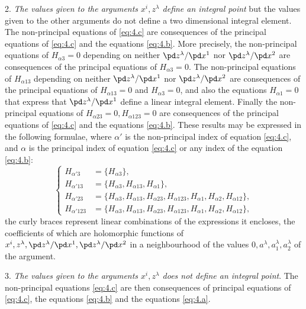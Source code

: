 2. \emph{The values given to the arguments $x^{i}, z^{\lambda}$ define an integral point} but the values given to the other arguments do not define a two dimensional integral element. The non-principal equations of \eqref{eq:4.c} are  consequences of the principal equations of \eqref{eq:4.c} and the equations \eqref{eq:4.b}. More precisely, the non-principal equations of $H_{\alpha 3}=0$ depending on neither $\pd z^\lambda/\pd x^{1}$ nor $\pd z^{\lambda}/\pd x^{2}$ are consequences of the principal equations of $H_{\alpha 3}=0$. The non-principal equations of $H_{\alpha 13}$ depending on neither $\pd z^\lambda/\pd x^{1}$ nor $\pd z^{\lambda}/\pd x^{2}$ are consequences of the principal equations of $H_{\alpha 13}=0$ and $H_{\alpha 3}=0$, and also the equations $H_{\alpha 1}=0$ that express that $\pd z^{\lambda}/\pd x^{1}$ define a linear integral element. Finally the non-principal equations of $H_{\alpha 23}=0, H_{\alpha 123}=0$ are consequences of the principal equations of \eqref{eq:4.c} and the equations \eqref{eq:4.b}. These results may be expressed in the following formulae, where $\alpha'$ is the non-principal index of equation \eqref{eq:4.c}, and $\alpha$ is the principal index of equation \eqref{eq:4.c} or any index of the equation \eqref{eq:4.b}:
\begin{equation}
  \label{eq:4.9}
  \left\{
    \begin{aligned}
      H_{\alpha'3}&=\{H_{\alpha 3}\},\\
      H_{\alpha'13}&=\{H_{\alpha 3}, H_{\alpha 13}, H_{\alpha 1}\},\\
      H_{\alpha'23}&=\{H_{\alpha 3}, H_{\alpha 13}, H_{\alpha 23}, H_{\alpha 123}, H_{\alpha 1}, H_{\alpha 2}, H_{\alpha 12}\},\\
      H_{\alpha'123}&=\{H_{\alpha 3}, H_{\alpha 13}, H_{\alpha 23}, H_{\alpha 123}, H_{\alpha 1}, H_{\alpha 2}, H_{\alpha 12}\},
    \end{aligned}
  \right.
\end{equation}
the curly braces represent  linear combinations of the expressions it encloses, the coefficients of which are holomorphic functions of $x^{i}, z^{\lambda}, \pd z^{\lambda}/\pd x^{1}, \pd z^{\lambda}/\pd x^{2}$ in a neighbourhood of the values $0, a^{\lambda}, a^{\lambda}_{1}, a^{\lambda}_{2}$ of the argument.
\vspace{12pt}

3. \emph{The values given to the arguments $x^{i}, z^{\lambda}$ does not define an integral point}. The non-principal equations \eqref{eq:4.c} are then consequences of principal equations of \eqref{eq:4.c}, the equations \eqref{eq:4.b} and the equations \eqref{eq:4.a}.
\vspace{12pt}

